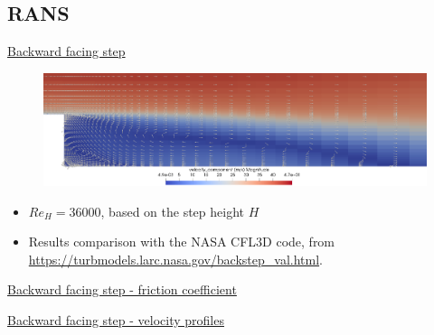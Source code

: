 \documentclass{beamer}
\begin{document}
\subsection*{RANS}
\begin{frame}[label=bfs]{\hyperlink{bfsSupp}{Backward facing step}}
\begin{figure}
	\centering
	\includegraphics[width=\textwidth]{bfs_glimphs.png}
\end{figure}
\vspace{0.5cm}
\begin{itemize}
	\item $Re_H = 36000$, based on the step height $H$
	\item Results comparison with the NASA CFL3D code, from 
	{\small \url{https://turbmodels.larc.nasa.gov/backstep_val.html}}.
\end{itemize}

\end{frame}
\begin{frame}{\hyperlink{bfsSupp}{Backward facing step - friction coefficient}}
\begin{figure}
	\centering
	
\end{figure}
\end{frame}
\begin{frame}{\hyperlink{bfsSupp}{Backward facing step - velocity profiles}}
\vspace{-0.7cm}
\begin{figure}
	\subfloat[\tiny Profile at 
	$x/H=1$]{\hspace{-1cm}}
	\subfloat[\tiny Profile at $x/H=6$]{}
\end{figure}
\end{frame}
\end{document}
